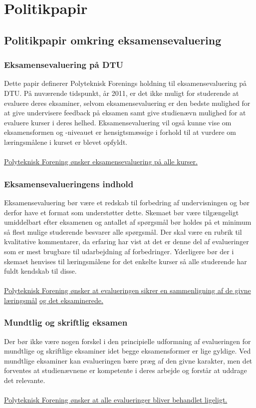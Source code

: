\section{Politikpapir}

\subsection{Politikpapir omkring eksamensevaluering}
\subsubsection{Eksamensevaluering på DTU}
Dette papir definerer Polyteknisk Forenings holdning til eksamensevaluering på DTU.
På nuværende tidspunkt, år 2011, er det ikke muligt for studerende at evaluere deres eksaminer, selvom eksamensevaluering er den bedste mulighed for at give undervisere feedback på eksamen samt give studienævn mulighed for at evaluere kurser i deres helhed. Eksamensevaluering vil også kunne vise om eksamensformen og -niveauet er hensigtsmæssige i forhold til at vurdere om læringsmålene i kurset er blevet opfyldt.\\
\\
\underline{Polyteknisk Forening ønsker eksamensevaluering på alle kurser.}

\subsubsection{Eksamensevalueringens indhold}
Eksamensevaluering bør være et redskab til forbedring af undervisningen og bør derfor have et format som understøtter dette. Skemaet bør være tilgængeligt umiddelbart efter eksamenen og antallet af spørgsmål bør holdes på et minimum så flest mulige studerende besvarer alle spørgsmål. Der skal være en rubrik til kvalitative kommentarer, da erfaring har vist at det er denne del af evalueringer som er mest brugbare til udarbejdning af forbedringer. Yderligere bør der i skemaet henvises til læringsmålene for det enkelte kurser så alle studerende har fuldt kendskab til disse.\\
\\
\underline{Polyteknisk Forening ønsker at evalueringen sikrer en sammenligning af de givne læringsmål}
\underline{og det eksaminerede.}

\subsubsection{Mundtlig og skriftlig eksamen}
Der bør ikke være nogen forskel i den principielle udformning af evalueringen for mundtlige og skriftlige eksaminer idet begge eksamensformer er lige gyldige. Ved mundtlige eksaminer kan evalueringen bære præg af den givne karakter, men det forventes at studienævnene er kompetente i deres arbejde og forstår at uddrage det relevante.\\
\\
\underline{Polyteknisk Forening ønsker at alle evalueringer bliver behandlet ligeligt.}

